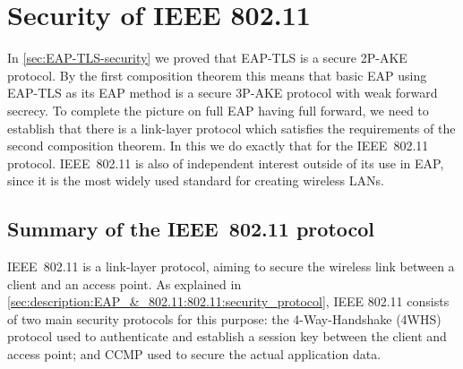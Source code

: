 \chapter{Security of IEEE 802.11}\label{sec:802.11}

\begingroup
\hypersetup{linkcolor=black}
\minitoc
\endgroup

In \cref{sec:EAP-TLS-security} we proved that EAP-TLS is a secure 2P-AKE protocol.
By the first composition theorem this means that basic EAP using EAP-TLS as its EAP method is a secure 3P-AKE protocol with weak forward secrecy.
To complete the picture on full EAP having full forward,
we need to establish that there is a link-layer protocol which satisfies the requirements of the second composition theorem.
In this  we do exactly that for the IEEE~802.11 protocol.
IEEE~802.11 is also of independent interest outside of its use in EAP,
since it is the most widely used standard for creating wireless LANs.




\section{Summary of the IEEE~802.11 protocol}


IEEE~802.11  is a link-layer protocol,
aiming to secure the wireless link between a client and an access point. 
As explained in \cref{sec:description:EAP_&_802.11:802.11:security_protocol},
IEEE 802.11 consists of two main security protocols for this purpose:
the 4-Way-Handshake (4WHS) protocol used to authenticate and establish a session key between the client and access point;
and CCMP used to secure the actual application data.


